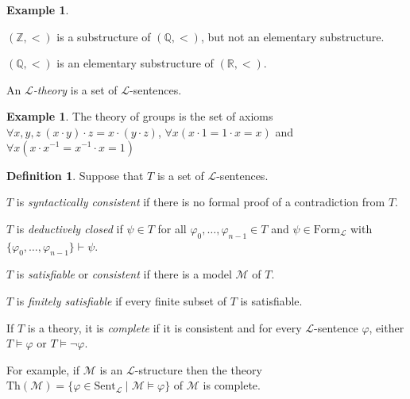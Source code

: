 \documentclass[10pt]{amsart}
\renewcommand{\L}{\mathcal{L}}
\newcommand{\ZZ}{\mathbb{Z}}
\newcommand{\QQ}{\mathbb{Q}}
\newcommand{\RR}{\mathbb{R}}
\newcommand{\MM}{\mathcal{M}}
\newcommand{\Th}{\mathrm{Th}}
\theoremstyle{definition}
\newtheorem{definition}[theorem]{Definition}
\newtheorem{example}[theorem]{Example}
\theoremstyle{remark}
\newenvironment{enumerate-(a)}{\begin{enumerate}[label={\upshape (\alph*)}, leftmargin=2pc]}{\end{enumerate}}
\begin{document}
\begin{example} 
\begin{enumerate-(a)} 
\item 
$(\ZZ,<)$ is a substructure of $(\QQ,<)$, but not an elementary substructure. 
\item 
$(\QQ,<)$ is an elementary substructure of $(\RR,<)$. 
\end{enumerate-(a)} 
\end{example} 

An \emph{$\L$-theory} is a set of $\L$-sentences. 

\begin{example} 
The theory of groups is the set of axioms 
$\forall x,y,z\ (x\cdot y)\cdot z=x\cdot (y\cdot z)$, 
$\forall x (x\cdot 1= 1\cdot x= x)$ and 
$\forall x (x\cdot x^{-1}= x^{-1}\cdot x = 1)$
\end{example} 

\begin{definition} 
Suppose that $T$ is a set of $\L$-sentences. 
\begin{enumerate-(a)} 
\item 
$T$ is \emph{syntactically consistent} if there is no formal proof of a contradiction from $T$. 
\item 
$T$ is \emph{deductively closed} if $\psi\in T$ for all $\varphi_0,\dots,\varphi_{n-1}\in T$ and $\psi\in\mathrm{Form}_\L$ with $\{\varphi_0,\dots,\varphi_{n-1}\}\vdash \psi$. 
\item 
$T$ is \emph{satisfiable} or \emph{consistent} if there is a model $\MM$ of $T$. 
\item 
$T$ is \emph{finitely satisfiable} if every finite subset of $T$ is satisfiable. 
\item 
If $T$ is a theory, it is \emph{complete} if it is consistent and for every $\L$-sentence $\varphi$, either $T\models \varphi$ or $T\models \neg\varphi$. 
\end{enumerate-(a)} 
\end{definition} 

For example, if $\MM$ is an $\L$-structure then the theory $\Th(\MM)=\{\varphi\in\mathrm{Sent}_\L\mid \MM\models \varphi\}$ of $\MM$ is complete. 
\end{document}
